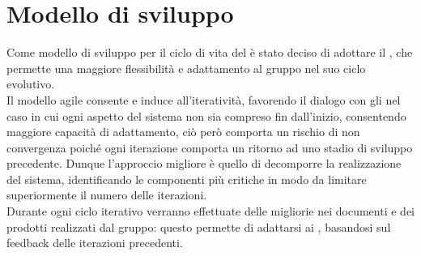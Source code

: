 \clearpage
\section{Modello di sviluppo}
\label{sec:modello_sviluppo}
Come modello di sviluppo per il ciclo di vita del  è stato deciso di adottare il , che permette una maggiore flessibilità e adattamento al gruppo nel suo ciclo evolutivo.\\
Il modello agile consente e induce all'iteratività, favorendo il dialogo con gli  nel caso in cui ogni aspetto del sistema non sia compreso fin dall'inizio, consentendo maggiore capacità di adattamento, ciò però comporta un rischio di non convergenza poiché ogni iterazione comporta un ritorno ad uno stadio di sviluppo precedente.
Dunque l'approccio migliore è quello di decomporre la realizzazione del sistema, identificando le componenti più critiche in modo da limitare superiormente il numero delle iterazioni.\\
Durante ogni ciclo iterativo verranno effettuate delle migliorie nei documenti e dei prodotti realizzati dal gruppo: questo permette di adattarsi ai , basandosi sul feedback delle iterazioni precedenti.

